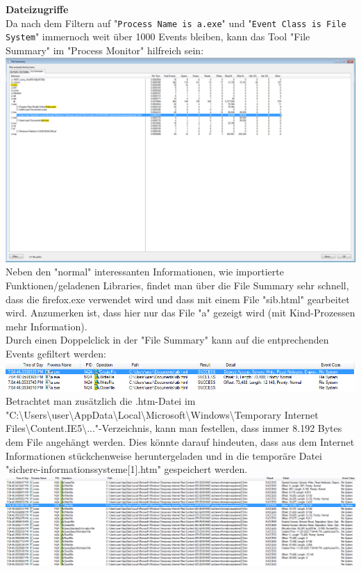 \documentclass{article}
\begin{document}
	\noindent\textbf{Dateizugriffe}\\
	Da nach dem Filtern auf "\texttt{Process Name is a.exe}" und "\texttt{Event Class is File System}" immernoch weit über 1000 Events bleiben, kann das Tool "File Summary" im "Process Monitor" hilfreich sein:\\
	\includegraphics[width=1\linewidth]{"pictures/2.2 File Summary"}
	Neben den "normal" interessanten Informationen, wie importierte Funktionen/geladenen Libraries, findet man über die File Summary sehr schnell, dass die firefox.exe verwendet wird und dass mit einem File "sib.html" gearbeitet wird. Anzumerken ist, dass hier nur das File "a" gezeigt wird (mit Kind-Prozessen mehr Information).\\
	Durch einen Doppelclick in der "File Summary" kann auf die entprechenden Events gefiltert werden:\\
	\includegraphics[width=1\linewidth]{"pictures/2.2 File Summary2"}
	Betrachtet man zusätzlich die .htm-Datei im "C:\textbackslash Users\textbackslash user\textbackslash AppData\textbackslash Local\textbackslash Microsoft\textbackslash Windows\textbackslash Temporary Internet Files\textbackslash Content.IE5\textbackslash ..."-Verzeichnis, kann man festellen, dass immer 8.192 Bytes dem File angehängt werden. Dies könnte darauf hindeuten, dass aus dem Internet Informationen stückchenweise heruntergeladen und in die temporäre Datei "sichere-informationssysteme[1].htm" gespeichert werden.\\
	\includegraphics[width=1\linewidth]{"pictures/2.2 File Summary3"}
	
\end{document}
